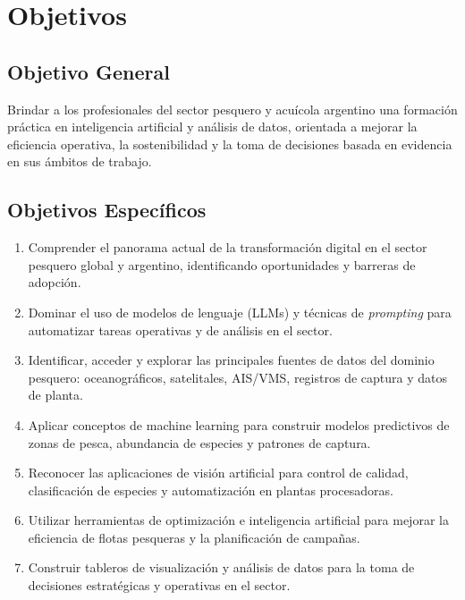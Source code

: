 \documentclass[12pt,a4paper]{article}
\begin{document}
\section{Objetivos}

\subsection{Objetivo General}

Brindar a los profesionales del sector pesquero y acuícola argentino una formación práctica en inteligencia artificial y análisis de datos, orientada a mejorar la eficiencia operativa, la sostenibilidad y la toma de decisiones basada en evidencia en sus ámbitos de trabajo.

\subsection{Objetivos Específicos}

\begin{enumerate}
  \item Comprender el panorama actual de la transformación digital en el sector pesquero global y argentino, identificando oportunidades y barreras de adopción.
  \item Dominar el uso de modelos de lenguaje (LLMs) y técnicas de \textit{prompting} para automatizar tareas operativas y de análisis en el sector.
  \item Identificar, acceder y explorar las principales fuentes de datos del dominio pesquero: oceanográficos, satelitales, AIS/VMS, registros de captura y datos de planta.
  \item Aplicar conceptos de machine learning para construir modelos predictivos de zonas de pesca, abundancia de especies y patrones de captura.
  \item Reconocer las aplicaciones de visión artificial para control de calidad, clasificación de especies y automatización en plantas procesadoras.
  \item Utilizar herramientas de optimización e inteligencia artificial para mejorar la eficiencia de flotas pesqueras y la planificación de campañas.
  \item Construir tableros de visualización y análisis de datos para la toma de decisiones estratégicas y operativas en el sector.
\end{enumerate}
\end{document}
